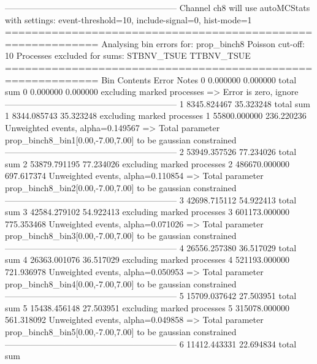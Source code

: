 ------------------------------------------------------------
Channel ch8 will use autoMCStats with settings: event-threshold=10, include-signal=0, hist-mode=1
============================================================
Analysing bin errors for: prop_binch8
Poisson cut-off: 10
Processes excluded for sums: STBNV_TSUE TTBNV_TSUE
============================================================
Bin        Contents        Error           Notes                         
0          0.000000        0.000000        total sum                     
0          0.000000        0.000000        excluding marked processes    
  => Error is zero, ignore      
------------------------------------------------------------
1          8345.824467     35.323248       total sum                     
1          8344.085743     35.323248       excluding marked processes    
1          55800.000000    236.220236      Unweighted events, alpha=0.149567
  => Total parameter prop_binch8_bin1[0.00,-7.00,7.00] to be gaussian constrained
------------------------------------------------------------
2          53949.357526    77.234026       total sum                     
2          53879.791195    77.234026       excluding marked processes    
2          486670.000000   697.617374      Unweighted events, alpha=0.110854
  => Total parameter prop_binch8_bin2[0.00,-7.00,7.00] to be gaussian constrained
------------------------------------------------------------
3          42698.715112    54.922413       total sum                     
3          42584.279102    54.922413       excluding marked processes    
3          601173.000000   775.353468      Unweighted events, alpha=0.071026
  => Total parameter prop_binch8_bin3[0.00,-7.00,7.00] to be gaussian constrained
------------------------------------------------------------
4          26556.257380    36.517029       total sum                     
4          26363.001076    36.517029       excluding marked processes    
4          521193.000000   721.936978      Unweighted events, alpha=0.050953
  => Total parameter prop_binch8_bin4[0.00,-7.00,7.00] to be gaussian constrained
------------------------------------------------------------
5          15709.037642    27.503951       total sum                     
5          15438.456148    27.503951       excluding marked processes    
5          315078.000000   561.318092      Unweighted events, alpha=0.049858
  => Total parameter prop_binch8_bin5[0.00,-7.00,7.00] to be gaussian constrained
------------------------------------------------------------
6          11412.443331    22.694834       total sum                     
